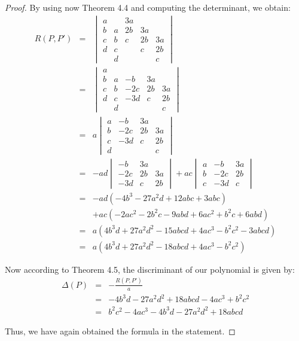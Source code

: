 \documentclass[12pt]{amsbook}
\begin{document}
\begin{proof}
By using now Theorem 4.4 and computing the determinant, we obtain:
\begin{eqnarray*}
R(P,P')
&=&\begin{vmatrix}
a&&3a\\
b&a&2b&3a\\
c&b&c&2b&3a\\
d&c&&c&2b\\
&d&&&c
\end{vmatrix}\\
&=&\begin{vmatrix}
a&&\\
b&a&-b&3a\\
c&b&-2c&2b&3a\\
d&c&-3d&c&2b\\
&d&&&c
\end{vmatrix}\\
&=&a\begin{vmatrix}
a&-b&3a\\
b&-2c&2b&3a\\
c&-3d&c&2b\\
d&&&c
\end{vmatrix}\\
&=&-ad\begin{vmatrix}
-b&3a\\
-2c&2b&3a\\
-3d&c&2b
\end{vmatrix}
+ac\begin{vmatrix}
a&-b&3a\\
b&-2c&2b\\
c&-3d&c
\end{vmatrix}\\
&=&-ad(-4b^3-27a^2d+12abc+3abc)\\
&&+ac(-2ac^2-2b^2c-9abd+6ac^2+b^2c+6abd)\\
&=&a(4b^3d+27a^2d^2-15abcd+4ac^3-b^2c^2-3abcd)\\
&=&a(4b^3d+27a^2d^2-18abcd+4ac^3-b^2c^2)
\end{eqnarray*}

Now according to Theorem 4.5, the discriminant of our polynomial is given by:
\begin{eqnarray*}
\Delta(P)
&=&-\frac{R(P,P')}{a}\\
&=&-4b^3d-27a^2d^2+18abcd-4ac^3+b^2c^2\\
&=&b^2c^2-4ac^3-4b^3d-27a^2d^2+18abcd
\end{eqnarray*}

Thus, we have again obtained the formula in the statement.
\end{proof}
\end{document}
